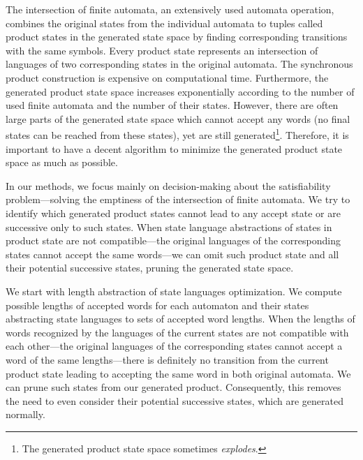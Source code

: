 
The intersection of finite automata, an extensively used automata operation, combines the original states from the individual automata to tuples called product states in the generated state space by finding corresponding transitions with the same symbols. Every product state represents an intersection of languages of two corresponding states in the original automata. The synchronous product construction is expensive on computational time. Furthermore, the generated product state space increases exponentially according to the number of used finite automata and the number of their states. However, there are often large parts of the generated state space which cannot accept any words (no final states can be reached from these states), yet are still generated\footnote{The generated product state space sometimes \emph{explodes}.}. Therefore, it is important to have a decent algorithm to minimize the generated product state space as much as possible.


In our methods, we focus mainly on decision-making about the satisfiability problem---solving the emptiness of the intersection of finite automata. We try to identify which generated product states cannot lead to any accept state or are successive only to such states. When state language abstractions of states in product state are not compatible---the original languages of the corresponding states cannot accept the same words---we can omit such product state and all their potential successive states, pruning the generated state space.


We start with length abstraction of state languages optimization. We compute possible lengths of accepted words for each automaton and their states abstracting state languages to sets of accepted word lengths. When the lengths of words recognized by the languages of the current states are not compatible with each other---the original languages of the corresponding states cannot accept a word of the same lengths---there is definitely no transition from the current product state leading to accepting the same word in both original automata. We can prune such states from our generated product. Consequently, this removes the need to even consider their potential successive states, which are generated normally.

